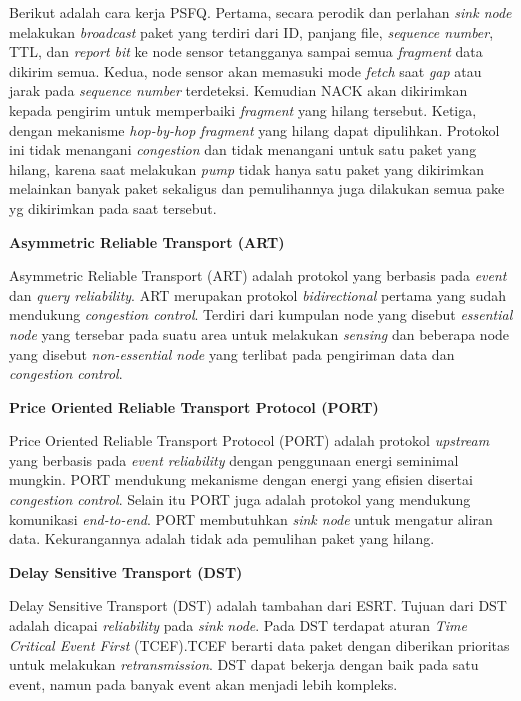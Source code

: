 \documentclass[a4paper,twoside]{article}
\begin{document}
\begin{enumerate}
Berikut adalah cara kerja PSFQ. Pertama, secara perodik dan perlahan \textit{sink node} melakukan \textit{broadcast} paket yang terdiri dari ID, panjang file, \textit{sequence number}, TTL, dan \textit{report bit} ke node sensor tetangganya sampai semua \textit{fragment} data dikirim semua. Kedua, node sensor akan memasuki mode \textit{fetch} saat \textit{gap} atau jarak pada \textit{sequence number} terdeteksi. Kemudian NACK akan dikirimkan kepada pengirim untuk memperbaiki \textit{fragment} yang hilang tersebut. Ketiga, dengan mekanisme \textit{hop-by-hop} \textit{fragment} yang hilang dapat dipulihkan. Protokol ini tidak menangani \textit{congestion} dan tidak menangani untuk satu paket yang hilang, karena saat melakukan \textit{pump} tidak hanya satu paket yang dikirimkan melainkan banyak paket sekaligus dan pemulihannya juga dilakukan semua pake yg dikirimkan pada saat tersebut.

\textbf{Asymmetric Reliable Transport (ART)}

Asymmetric Reliable Transport (ART) adalah protokol yang berbasis pada \textit{event} dan \textit{query reliability}. ART merupakan protokol \textit{bidirectional} pertama yang sudah mendukung \textit{congestion control}. Terdiri dari kumpulan node yang disebut \textit{essential node} yang tersebar pada suatu area untuk melakukan \textit{sensing} dan beberapa node yang disebut \textit{non-essential node} yang terlibat pada pengiriman data dan \textit{congestion control}.

\textbf{Price Oriented Reliable Transport Protocol (PORT)}

Price Oriented Reliable Transport Protocol (PORT) adalah protokol \textit{upstream} yang berbasis pada \textit{event reliability} dengan penggunaan energi seminimal mungkin. PORT mendukung mekanisme dengan energi yang efisien disertai \textit{congestion control}. Selain itu PORT juga adalah protokol yang mendukung komunikasi \textit{end-to-end}. PORT membutuhkan \textit{sink node} untuk mengatur aliran data. Kekurangannya adalah tidak ada pemulihan paket yang hilang.

\textbf{Delay Sensitive Transport (DST)}

Delay Sensitive Transport (DST) adalah tambahan dari ESRT. Tujuan dari DST adalah dicapai \textit{reliability} pada \textit{sink node}. Pada DST terdapat aturan \textit{Time Critical Event First} (TCEF).TCEF berarti data paket dengan diberikan prioritas untuk melakukan \textit{retransmission}. DST dapat bekerja dengan baik pada satu event, namun pada banyak event akan menjadi lebih kompleks.


\end{enumerate}
\end{document}
